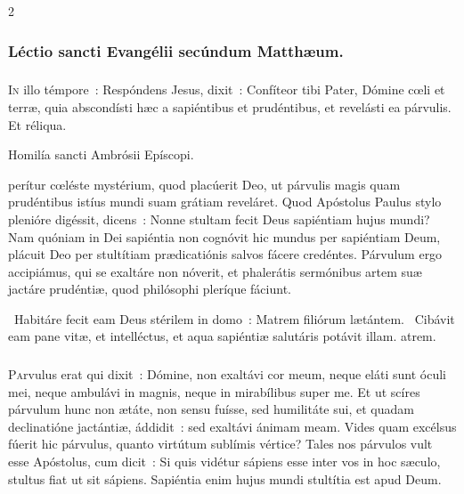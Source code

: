 \documentclass[9pt,twoside]{extarticle}
\begin{document}
\begin{multicols}{2}
{{\subsubsection*{\center Léctio sancti Evangélii secúndum Matthæum.}
\subsubsection*{\center {}}
\lettrine{I}n illo témpore~: Respóndens Jesus, dixit~: Confíteor tibi Pater, Dómine cœli et terræ, quia abscondísti hæc a sapiéntibus et prudéntibus, et revelásti ea párvulis. Et réliqua.

\begin{center}Homilía sancti Ambrósii Epíscopi.\\
\end{center}
perítur cœléste mystérium, quod placúerit Deo, ut párvulis magis quam prudéntibus istíus mundi suam grátiam reveláret. Quod Apóstolus Paulus stylo plenióre digéssit, dicens~: Nonne stultam fecit Deus sapiéntiam hujus mundi? Nam quóniam in Dei sapiéntia non cognóvit hic mundus per sapiéntiam Deum, plácuit Deo per stultítiam prædicatiónis salvos fácere credéntes. Párvulum ergo accipiámus, qui se exaltáre non nóverit, et phalerátis sermónibus artem suæ jactáre prudéntiæ, quod philósophi pleríque fáciunt.

\begin{tightlist}{}
\item {}~Habitáre fecit eam Deus stérilem in domo~: \textred{*} Matrem filiórum lætántem. ~Cibávit eam pane vitæ, et intelléctus, et aqua sapiéntiæ salutáris potávit illam. atrem.
\end{tightlist}

\subsubsection*{\center {}}
\lettrine{P}arvulus erat qui dixit~: Dómine, non exaltávi cor meum, neque eláti sunt óculi mei, neque ambulávi in magnis, neque in mirabílibus super me. Et ut scíres párvulum hunc non ætáte, non sensu fuísse, sed humilitáte sui, et quadam declinatióne jactántiæ, áddidit~: sed exaltávi ánimam meam. Vides quam excélsus fúerit hic párvulus, quanto virtútum sublímis vértice? Tales nos párvulos vult esse Apóstolus, cum dicit~: Si quis vidétur sápiens esse inter vos in hoc sæculo, stultus fiat ut sit sápiens. Sapiéntia enim hujus mundi stultítia est apud Deum.

}}
\end{multicols}
\end{document}

